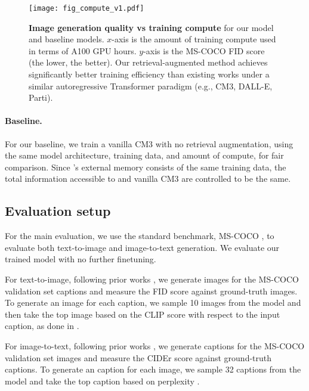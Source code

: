 \begin{table}[t]
\begin{center}
{}
\label{tbl:coco_image_results}
\end{center}\vspace{-2mm}
\end{table} \begin{figure}[!t]
    \centering
    \texttt{[image: fig\_compute\_v1.pdf]}
    \vspace{-2mm}
    \caption{\textbf{Image generation quality vs training compute} for our \methodname model and baseline models. $x$-axis is the amount of training compute used in terms of A100 GPU hours. $y$-axis is the MS-COCO FID score (the lower, the better).
    Our retrieval-augmented method achieves significantly better training efficiency than existing works under a similar autoregressive Transformer paradigm (e.g., CM3, DALL-E, Parti). 
    }
    \label{fig:compute}
\end{figure}


\paragraph{Baseline.} 
For our baseline, we train a vanilla CM3 with no retrieval augmentation, using the same model architecture, training data, and amount of compute, for {fair comparison}. Since \methodname's external memory consists of the same training data, the total information accessible to \methodname and vanilla CM3 are controlled to be the same.



\subsection{Evaluation setup}
\label{sec:exp-eval_setup}
For the main evaluation, we use the standard benchmark, MS-COCO  \cite{lin2014microsoft}, to evaluate both text-to-image and image-to-text generation. 
We evaluate our trained model with no further finetuning.

For text-to-image, following prior works \cite{ramesh2021zero, nichol2021glide}, we generate images for the MS-COCO validation set captions and measure the FID score \cite{heusel2017fid} against ground-truth images. To generate an image for each caption, we sample 10 images from the model and then take the top image based on the CLIP score \cite{radford2021learning} with respect to the input caption, as done in \citet{aghajanyan2022cm3}.

For image-to-text, following prior works \cite{alayrac2022flamingo}, we generate captions for the MS-COCO validation set images and measure the CIDEr score \cite{vedantam2015cider} against ground-truth captions.
To generate an caption for each image, we sample 32 captions from the model and take the top caption based on perplexity \citep{fried2022incoder}.



